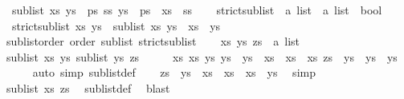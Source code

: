 \begin{isabellebody}
\ \ {\isachardoublequoteopen}sublist\ xs\ ys\ {\isacharequal}\ {\isacharparenleft}{\isasymexists}ps\ ss{\isachardot}\ ys\ {\isacharequal}\ ps\ {\isacharat}\ xs\ {\isacharat}\ ss{\isacharparenright}{\isachardoublequoteclose}\isanewline
\ \ \isanewline
{}\isamarkupfalse%
\ strict{\isacharunderscore}sublist\ {\isacharcolon}{\isacharcolon}\ {\isachardoublequoteopen}{\isacharprime}a\ list\ {\isasymRightarrow}\ {\isacharprime}a\ list\ {\isasymRightarrow}\ bool{\isachardoublequoteclose}\ \ \isanewline
\ \ {\isachardoublequoteopen}strict{\isacharunderscore}sublist\ xs\ ys\ {\isasymlongleftrightarrow}\ sublist\ xs\ ys\ {\isasymand}\ xs\ {\isasymnoteq}\ ys{\isachardoublequoteclose}\isanewline
\isanewline
{}\isamarkupfalse%
\ sublist{\isacharunderscore}order{\isacharcolon}\ order\ sublist\ strict{\isacharunderscore}sublist\isanewline
%
\isadelimproof
%
\endisadelimproof
%
\isatagproof
{}\isamarkupfalse%
\isanewline
\ \ \isamarkupfalse%
\ xs\ ys\ zs\ {\isacharcolon}{\isacharcolon}\ {\isachardoublequoteopen}{\isacharprime}a\ list{\isachardoublequoteclose}\isanewline
\ \ \isamarkupfalse%
\ {\isachardoublequoteopen}sublist\ xs\ ys{\isachardoublequoteclose}\ {\isachardoublequoteopen}sublist\ ys\ zs{\isachardoublequoteclose}\isanewline
\ \ \isamarkupfalse%
\ \isamarkupfalse%
\ xs{}\ xs{}\ ys{}\ ys{}\ \ {\isachardoublequoteopen}ys\ {\isacharequal}\ xs{}\ {\isacharat}\ xs\ {\isacharat}\ xs{}{\isachardoublequoteclose}\ {\isachardoublequoteopen}zs\ {\isacharequal}\ ys{}\ {\isacharat}\ ys\ {\isacharat}\ ys{}{\isachardoublequoteclose}\isanewline
\ \ \ \ \isamarkupfalse%
\ {\isacharparenleft}auto\ simp{\isacharcolon}\ sublist{\isacharunderscore}def{\isacharparenright}\isanewline
\ \ \isamarkupfalse%
\ {\isachardoublequoteopen}zs\ {\isacharequal}\ {\isacharparenleft}ys{}\ {\isacharat}\ xs{}{\isacharparenright}\ {\isacharat}\ xs\ {\isacharat}\ {\isacharparenleft}xs{}\ {\isacharat}\ ys{}{\isacharparenright}{\isachardoublequoteclose}\ \isamarkupfalse%
\ simp\isanewline
\ \ \isamarkupfalse%
\ {\isachardoublequoteopen}sublist\ xs\ zs{\isachardoublequoteclose}\ \isamarkupfalse%
\ sublist{\isacharunderscore}def\ \isamarkupfalse%
\ blast\isanewline
{}\isamarkupfalse%

\end{isabellebody}

